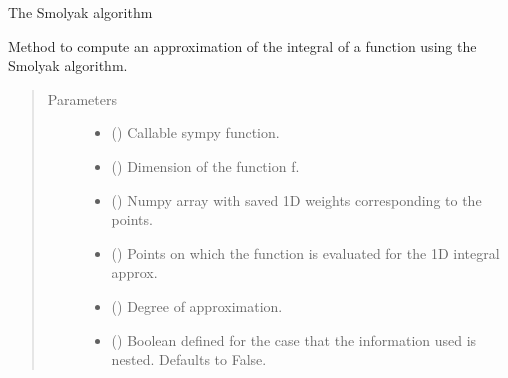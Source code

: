 \documentclass[letterpaper,10pt,english]{sphinxmanual}
\begin{document}

\begin{fulllineitems}
\label{\detokenize{index:Studienprojekt_Smolyak_qmc_one_point.smolyak}}
The Smolyak algorithm

Method to compute an approximation of the integral of a function using the Smolyak algorithm.
\begin{quote}\begin{description}
\item[{Parameters}] \leavevmode\begin{itemize}
\item {} 
 () \textendash{} Callable sympy function.

\item {} 
 () \textendash{} Dimension of the function f.

\item {} 
 () \textendash{} Numpy array with saved 1D weights corresponding to the points.

\item {} 
 () \textendash{} Points on which the function is evaluated for the 1D integral approx.

\item {} 
 () \textendash{} Degree of approximation.

\item {} 
 (\sphinxstyleliteralemphasis{\sphinxupquote{, }}) \textendash{} Boolean defined for the case that the information used is nested. Defaults to False.


\end{itemize}
\end{description}
\end{quote}
\end{fulllineitems}
\end{document}
